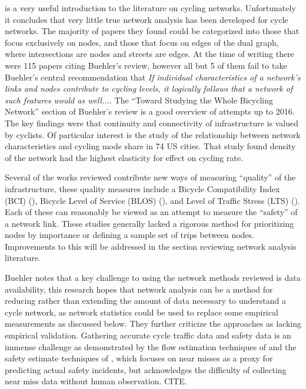 \documentclass[11pt]{article} %
\begin{document}
\cite{buehler2016bikeway} is a very useful introduction to the literature on cycling networks. Unfortunately it concludes that very little true network analysis has been developed for cycle networks. The majority of papers they found could be categorized into those that focus exclusively on nodes, and those that focus on edges of the dual graph, where intersections are nodes and streets are edges. At the time of writing there were 115 papers citing Buehler's review, however all but 5 of them fail to take Buehler's central recommendation that \textit{If individual characteristics of a network's links and nodes contribute to cycling levels, it logically follows that a network of such features would as well...}. The ``Toward Studying the Whole Bicycling Network'' section of Buehler's review is a good overview of attempts up to 2016. The key findings were that continuity and connectivity of infrastructure is valued by cyclists. Of particular interest is the \cite{schoner2014missing} study of the relationship between network characteristics and cycling mode share in 74 US cities. That study found density of the network had the highest elasticity for effect on cycling rate. 

Several of the works reviewed contribute new ways of measuring ``quality'' of the infrastructure, these quality measures include a Bicycle Compatibility Index (BCI) (\cite{klobucar2007network}),  Bicycle Level of Service (BLOS) (\cite{lowry2012assessment}), and Level of Traffic Stress (LTS) (\cite{mekuria2012low}). Each of these can reasonably be viewed as an attempt to measure the ``safety'' of a network link. These studies generally lacked a rigorous method for prioritizing nodes by importance or defining a sample set of trips between nodes. Improvements to this will be addressed in the section reviewing network analysis literature. 

Buehler notes that a key challenge to using the network methods reviewed is data availability, this research hopes that network analysis can be a method for reducing rather than extending the amount of data necessary to understand a cycle network, as network statistics could be used to replace some empirical measurements as discussed below.  They further criticize the approaches as lacking empirical validation. Gathering accurate cycle traffic data and safety data is an immense challenge as demonstrated by the flow estimation techniques of \cite{gosse2014estimating} and the safety estimate techniques of \cite{puchades2018role}, which focuses on near misses as a proxy for predicting actual safety incidents, but acknowledges the difficulty of collecting near miss data without human observation. CITE. 
\end{document}
